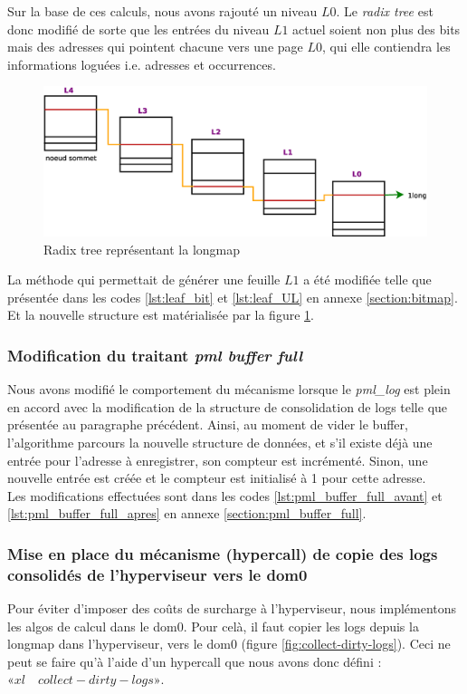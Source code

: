 \noindent Sur la base de ces calculs, nous avons rajouté un niveau $L0$. Le \textit{radix tree} est donc modifié de sorte que les entrées du niveau $L1$ actuel soient non plus des bits mais des adresses qui pointent chacune vers une page $L0$, qui elle contiendra les informations loguées i.e. adresses et occurrences.\\

\begin{figure}[H]
    \centering
    \includegraphics[scale=.6,width=1\linewidth]{chapters/4/fig4/longmap}
    \caption{Radix tree représentant la longmap}
    \label{fig:longmap}
\end{figure}

\noindent La méthode qui permettait de générer une feuille $L1$ a été modifiée telle que présentée dans les codes \ref{lst:leaf_bit} et \ref{lst:leaf_UL} en annexe \ref{section:bitmap}. Et la nouvelle structure est matérialisée par la figure \ref{fig:longmap}.

\subsubsection{Modification du traitant \textit{pml buffer full}}
Nous avons modifié le comportement du mécanisme lorsque le \textit{pml\_log} est plein en accord avec la modification de la structure de consolidation de logs telle que présentée au paragraphe précédent. Ainsi, au moment de vider le buffer, l'algorithme parcours la nouvelle structure de données, et s'il existe déjà une entrée pour l'adresse à enregistrer, son compteur est incrémenté. Sinon, une nouvelle entrée est créée et le compteur est initialisé à 1 pour cette adresse.\\
Les modifications effectuées sont dans les codes \ref{lst:pml_buffer_full_avant} et \ref{lst:pml_buffer_full_apres} en annexe \ref{section:pml_buffer_full}.

\subsubsection{Mise en place du mécanisme (hypercall) de copie des logs consolidés de l'hyperviseur vers le dom0}
Pour éviter d'imposer des coûts de surcharge à l'hyperviseur, nous implémentons les algos de calcul dans le dom0. Pour celà, il faut copier les logs depuis la longmap dans l'hyperviseur, vers le dom0 (figure \ref{fig:collect-dirty-logs}). Ceci ne peut se faire qu'à l'aide d'un hypercall que nous avons donc défini : $«xl \quad collect-dirty-logs»$.\\


